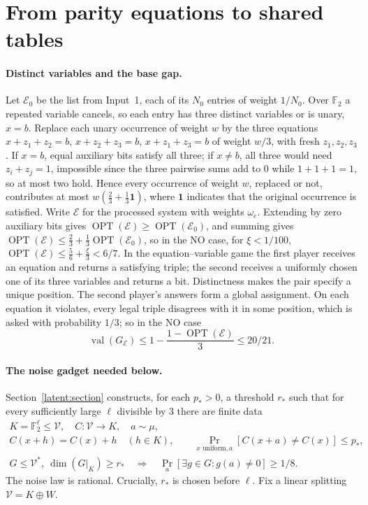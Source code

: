 \documentclass[11pt]{article}
\newcommand{\F}{\mathbb F}
\newcommand{\val}{\operatorname{val}}
\newcommand{\OPT}{\operatorname{OPT}}
\newcommand{\ind}{\mathbf 1}
\begin{document}
\section{From parity equations to shared tables}\label{sec:tables}

\paragraph{Distinct variables and the base gap.} Let $\mathcal E_0$ be the
list from Input~1, each of its $N_0$ entries of weight $1/N_0$. Over $\F_2$
a repeated variable cancels, so each entry has three distinct variables or
is unary, $x=b$. Replace each unary occurrence of weight $w$ by the three
equations $x+z_1+z_2=b$, $x+z_2+z_3=b$, $x+z_1+z_3=b$ of weight $w/3$, with
fresh $z_1,z_2,z_3$. If $x=b$, equal auxiliary bits satisfy all three; if
$x\ne b$, all three would need $z_i+z_j=1$, impossible since the three
pairwise sums add to $0$ while $1+1+1=1$, so at most two hold. Hence every
occurrence of weight $w$, replaced or not, contributes at most
$w(\frac23+\frac13\ind)$, where $\ind$ indicates that the original
occurrence is satisfied. Write $\mathcal E$ for the processed system with
weights $\omega_e$. Extending by zero auxiliary bits gives $\OPT(\mathcal
E)\ge\OPT(\mathcal E_0)$, and summing gives $\OPT(\mathcal
E)\le\frac23+\frac13\OPT(\mathcal E_0)$, so in the NO case, for
$\xi<1/100$, $\OPT(\mathcal E)\le\frac56+\frac\xi3<6/7$. In the
equation--variable game the first player receives an equation and returns a
satisfying triple; the second receives a uniformly chosen one of its three
variables and returns a bit. Distinctness makes the pair specify a unique
position. The second player's answers form a global assignment. On each equation it
violates, every legal triple disagrees with it in some position, which is
asked with probability $1/3$; so in the NO case
\begin{equation}\label{eq:base-gap}
 \val(G_{\mathcal E})\le1-\frac{1-\OPT(\mathcal E)}3\le20/21.
\end{equation}

\paragraph{The noise gadget needed below.}
Section~\ref{latent:section} constructs, for each $p_*>0$, a threshold $r_*$
such that for every sufficiently large $\ell$ divisible by $3$ there are
finite data
\begin{equation}\label{eq:gadget-contract}
 \begin{gathered}
 K=\F_2^\ell\le\mathcal V,\quad C:\mathcal V\to K,\quad a\sim\mu,\\
 C(x+h)=C(x)+h\quad(h\in K),\qquad
 \Pr_{x\text{ uniform},a}[C(x+a)\ne C(x)]\le p_*,\\
 G\le\mathcal V^*,\ \dim(G|_K)\ge r_*
 \quad\Longrightarrow\quad
 \Pr_a[\exists g\in G:g(a)\ne0]\ge1/8.
 \end{gathered}
\end{equation}
The noise law is rational. Crucially, $r_*$ is chosen before $\ell$.
Fix a linear splitting $\mathcal V=K\oplus W$.
\end{document}
